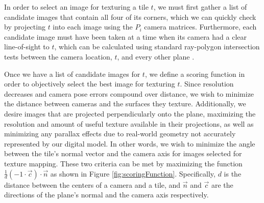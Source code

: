 \documentclass[]{spie}  %
\begin{document}
{  In order to select an image for texturing a tile $t$, we must first
  gather a list of candidate images that contain all four of its
  corners, which we can quickly check by projecting $t$ into each
  image using the $P_i$ camera matrices. Furthermore, each candidate
  image must have been taken at a time when its camera had a clear
  line-of-sight to $t$, which can be calculated using standard
  ray-polygon intersection tests between the camera location, $t$, and
  every other plane \cite{rayintersection}.

  Once we have a list of candidate images for $t$, we define a scoring
  function in order to objectively select the best image for texturing
  $t$. Since resolution decreases and camera pose errors compound over
  distance, we wish to minimize the distance between cameras and the
  surfaces they texture. Additionally, we desire images that are
  projected perpendicularly onto the plane, maximizing the resolution
  and amount of useful texture available in their projections, as well
  as minimizing any parallax effects due to real-world geometry not
  accurately represented by our digital model. In other words, we wish
  to minimize the angle between the tile's normal vector and the
  camera axis for images selected for texture mapping. These two
  criteria can be met by maximizing the function $\frac{1}{d} (-1
  \cdot \vec{c}) \cdot \vec{n}$ as shown in Figure
  \ref{fig:scoringFunction}. Specifically, $d$ is the distance between
  the centers of a camera and a tile, and $\vec{n}$ and $\vec{c}$ are
  the directions of the plane's normal and the camera axis
  respectively.

\begin{figure}
  \centering {}


\end{figure}}
\end{document}

